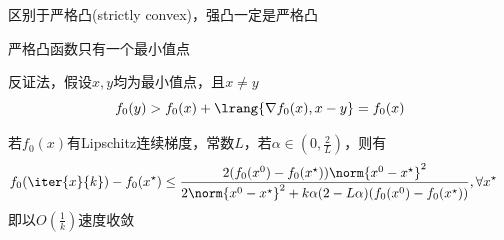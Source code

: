 区别于严格凸(strictly convex)，强凸一定是严格凸
\begin{theorem}
    严格凸函数只有一个最小值点
\end{theorem}
\begin{analysis}
    反证法，假设$x,y$均为最小值点，且$x\ne y$
    \[f_0(y)>f_0(x)+\lrang{\nabla f_0(x),x-y}=f_0(x)\]
\end{analysis}

\begin{theorem}
    若$f_0(x)$有Lipschitz连续梯度，常数$L$，若$\alpha\in(0,\frac{2}{L})$，则有
    \[\begin{aligned}
        f_0(\iter{x}{k})-f_0(x^\star)&\leq \frac{2(f_0(x^0)-f_0(x^\star))\norm{x^0-x^\star}^2}
        {2\norm{x^0-x^\star}^2+k\alpha(2-L\alpha)(f_0(x^0)-f_0(x^\star))},\forall x^\star
    \end{aligned}\]
    即以$O(\frac{1}{k})$速度收敛
\end{theorem}
